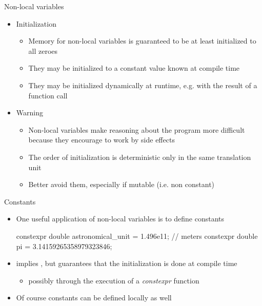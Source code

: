 \begin{frame}[fragile]{Non-local variables \insertcontinuationtext}
  \begin{itemize}
  \item<1-> Initialization
    \begin{itemize}
    \item Memory for non-local variables is guaranteed to be at least
      initialized to all zeroes
    \item They may be initialized to a constant value known at compile time
    \item They may be initialized dynamically at runtime, e.g. with the result
      of a function call
    \end{itemize}
  \item<2-> Warning
    \begin{itemize}
    \item Non-local variables make reasoning about the program more difficult
      because they encourage to work by side effects
    \item The order of initialization is deterministic only in the same
      translation unit
    \item \alert{Better avoid them}, especially if mutable (i.e. non constant)
    \end{itemize}
  \end{itemize}
\end{frame}

\begin{frame}[fragile]{Constants}

  \begin{itemize}
  \item One useful application of non-local variables is to define constants
    \begin{codeblock}
constexpr double astronomical_unit = 1.496e11; // meters
constexpr double pi = 3.14159265358979323846;\end{codeblock}
  \item<2->  implies , but \alert{guarantees} that the
    initialization is done at compile time
    \begin{itemize}
    \item<2-> possibly through the execution of a \textit{constexpr} function
    \end{itemize}
  \item<3->Of course constants can be defined locally as well
  \end{itemize}

\end{frame}

